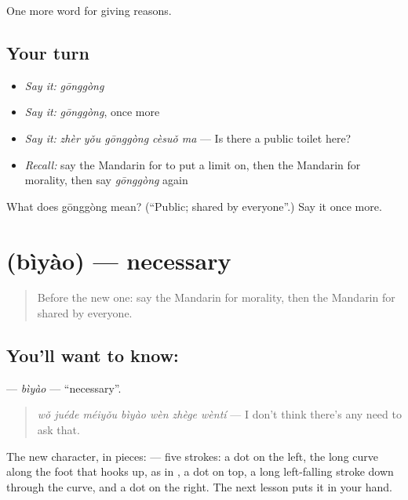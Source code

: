 \begin{grammarlens}[title={What you've built}]
One more word for giving reasons.
\end{grammarlens}

\subsection*{Your turn}
\begin{itemize}
\raggedright
  \item \emph{Say it:} \emph{gōnggòng}
  \item \emph{Say it:} \emph{gōnggòng}, once more
  \item \emph{Say it:} \emph{zhèr yǒu gōnggòng cèsuǒ ma} — Is there a public toilet here?
  \item \emph{Recall:} say the Mandarin for to put a limit on, then the Mandarin for morality, then say \emph{gōnggòng} again
\end{itemize}

\begin{tcolorbox}[breakable,colback=teal!4,colframe=teal!35!black,title={Before you move on}]
What does gōnggòng mean? (\textquotedblleft{}Public; shared by everyone\textquotedblright{}.) Say it once more.
\end{tcolorbox}
\section[\texorpdfstring{\zh{必要} (bìyào)}{必要 (bìyào)}]{ (bìyào) — necessary}

\label{lesson:ZH-C360-biyao}



\begin{quote}
Before the new one: say the Mandarin for morality, then the Mandarin for shared by everyone.
\end{quote}

\subsection*{You'll want to know: }
\textbf{} — \emph{bìyào} — \textquotedblleft{}necessary\textquotedblright{}.

\begin{quote}
\textbf{} \emph{wǒ juéde méiyǒu bìyào wèn zhège wèntí} — I don't think there's any need to ask that.
\end{quote}

The new character, in pieces:  — five strokes: a dot on the left, the long curve along the foot that hooks up, as in , a dot on top, a long left-falling stroke down through the curve, and a dot on the right. The next lesson puts it in your hand.

